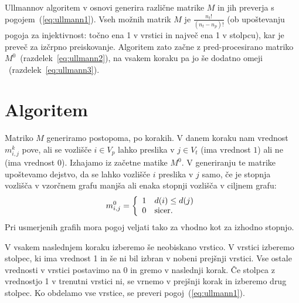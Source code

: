 \documentclass[a4paper, 12pt, ]{book}
\begin{document}
	Ullmannov algoritem v osnovi generira različne matrike $M$ in jih preverja s pogojem~(\ref{eq:ullmann1}). Vseh možnih matrik $M$ je
	$\frac{n_t!}{(n_t-n_p)!}$ (ob upoštevanju pogoja za injektivnost: točno ena 1 v vrstici in največ ena 1 v stolpcu), kar je preveč za izčrpno preiskovanje.
	Algoritem zato začne z pred-procesirano matriko $M^0$~(razdelek~\ref{eq:ullmann2}), na vsakem koraku pa jo še dodatno omeji
	~(razdelek~\ref{eq:ullmann3}).
	
	
	\section{Algoritem}
	Matriko $M$ generiramo postopoma, po korakih. V danem koraku nam vrednost $m_{i,j}^k$ pove, ali se vozlišče $i \in V_p$ lahko preslika 
	v $j \in V_t$ (ima vrednost $1$) ali ne	(ima vrednost $0$). Izhajamo iz začetne matike $M^0$. V generiranju te matrike upoštevamo dejstvo, da
	se lahko vozlišče $i$ preslika v $j$ samo, če je stopnja vozlišča v vzorčnem grafu manjša ali enaka stopnji vozlišča v ciljnem grafu:
		\begin{equation}
		\label{eq:ullmann2}
		m_{i,j}^0 = \left\{ 
		  \begin{array}{l l}
		    1 & \text{$d(i) \leq d(j)$}\\
		    0 & \text{sicer.}
		  \end{array} \right.
		\end{equation}
	Pri usmerjenih grafih mora pogoj  veljati tako za vhodno kot za izhodno stopnjo.
	
	V vsakem naslednjem koraku izberemo še neobiskano vrstico. V vrstici izberemo stolpec, ki ima vrednost 1 in še ni bil izbran v nobeni prejšnji vrstici.
	Vse ostale vrednosti v vrstici postavimo na 0
	in gremo v naslednji korak. Če stolpca z vrednostjo 1 v trenutni vrstici ni, se vrnemo v prejšnji korak in izberemo drug stolpec. Ko obdelamo vse vrstice,
	se preveri pogoj~(\ref{eq:ullmann1}).
	
\end{document}
